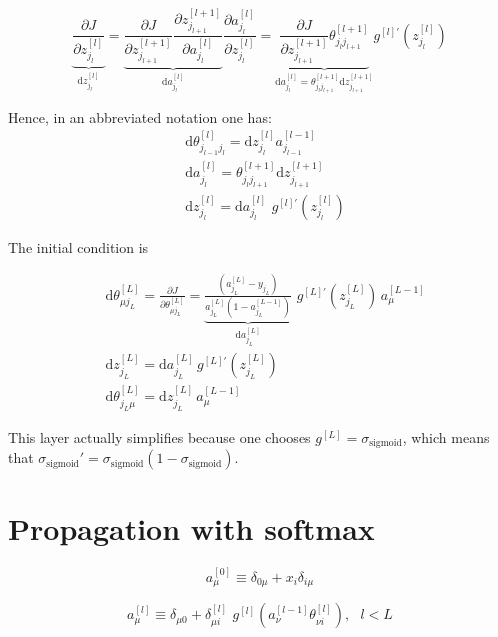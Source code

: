 \documentclass[a4paper,11pt]{article}
\newcommand{\dd}{\text{d}}
\newcommand{\na}[2]{a_{#1}^{[#2]}}
\newcommand{\nz}[2]{z_{#1}^{[#2]}}
\newcommand{\na}[3]{a_{#1 #2}^{[#2]}}
\newcommand{\nz}[3]{z_{#1 #2}^{[#2]}}
\newcommand{\nt}[3]{\theta_{#1 #2}^{[#3]}}
\newcommand{\nt}[4]{\theta_{#1 #2 #3}^{[#4]}}
\newcommand{\sg}{ \sigma_{\text{sigmoid}}}
\newcommand{\ff}[2]{#1 \left(#2 \right)}
\begin{document}
\begin{equation}
\underbrace{
\frac{\partial J  }{\partial \nz{j_l}{l}   }
}_{\dd  \nz{j_{l}}{l} }
	=
	\underbrace{
	\frac{\partial J  }{\partial \nz{j_{l+1}}{l+1}   }
	\frac{\partial \nz{j_{l+1}}{l+1}}{\partial \na{j_{l}}{l}}
	}_{\dd a_{j_l}^{[l]} }
	\frac{\partial \na{j_{l}}{l}    }{ \partial \nz{j_{l}}{l}  }
	=
	\underbrace{
	\frac{\partial J  }{\partial \nz{j_{l+1}}{l+1}   }
	 \nt{j_l}{j_{l+1}}{l+1}
	 }_{ \dd a_{j_l}^{[l]}=\theta^{[l+1]}_{j_l j_{l+1}} \dd z_{j_{l+1}}^{[l+1]} }
	 g^{[l]'}\left( z_{j_{l}}^{[l]}   \right)
\end{equation}

Hence, in an abbreviated notation one has:
\begin{eqnarray}
	&\dd  \nt{j_{l-1}}{j_l}{l} = \dd  \nz{j_{l}}{l}  \na{j_{l-1}}{l-1}\\
	&\dd a_{j_{l}}^{[l]}=\theta^{[l+1]}_{j_{l} j_{l+1}} \dd z_{j_{l+1}}^{[l+1]}\\
	&\dd  \nz{j_{l}}{l}= \dd a_{j_l}^{[l]} \,\, g^{[l]'}\left( z_{j_{l}}^{[l]}   \right)
\end{eqnarray}

The initial condition is


\begin{eqnarray}
    &\dd \theta^{[L]}_{\mu j_L}= \frac{\partial J }{\partial  \nt{\mu}{j_L}{L}  } =
    \underbrace{
    \frac{(\na{j_L}{L} -y_{j_L})}{\na{j_L}{L} (1-\na{j_L}{L-1} )}
    }_{\dd a_{j_{L}}^{[L]} }
    \,\, g^{[L]'} \left( z_{j_{L}}^{[L]} \right)
   \, \na{\mu}{L-1} \\
   & \dd z^{[L]}_{j_L }= \dd a_{j_{L}}^{[L]}\,
   g^{[L]'} \left( z_{j_{L}}^{[L]} \right)\\
   &\dd \theta^{[L]}_{j_L \mu}=  \dd \nz{j_L }{L}\, \na{\mu}{L-1}
\end{eqnarray}



This layer actually simplifies because one chooses $g^{[L]}= \sg$,
which means that $\sg'= \sg (1- \sg) $.



\section{Propagation with softmax}


\begin{equation}
    \na{\mu}{0} \equiv \delta_{0\mu}+ x_i\delta_{i\mu}  %
\end{equation}

\begin{equation}
    \na{\mu}{l} \equiv \delta_{\mu0} +\delta_{\mu i }^{[l]}\,\,
    \ff{g^{[l]}}{\na{\nu }{l-1} \nt{\nu}{i}{l}  } , \,\,\,\, l<L %
\end{equation}
\end{document}
